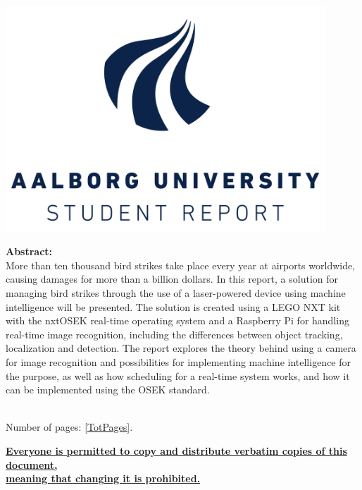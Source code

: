 \begin{minipage}[T]{0.45\textwidth}
 \begin{flushright}
  \includegraphics[width=0.9\textwidth]{images/aau_logo.pdf}\\[1.0 cm]
 \end{flushright}
 \begin{flushleft}
  \textbf{Abstract:}\\
    More than ten thousand bird strikes take place every year at airports worldwide, causing damages for more than a billion dollars. 
    In this report, a solution for managing bird strikes through the use of a laser-powered device using machine intelligence will be presented.
    The solution is created using a LEGO NXT kit with the nxtOSEK real-time operating system and a Raspberry Pi for handling real-time image recognition, including the differences between object tracking, localization and detection.
    The report explores the theory behind using a camera for image recognition and possibilities for implementing machine intelligence for the purpose, as well as how scheduling for a real-time system works, and how it can be implemented using the OSEK standard.


 \end{flushleft}
\end{minipage}\\
Number of pages: \ref{TotPages}.\\
\begin{center}
 \begin{scriptsize}
  \textbf{\underline{Everyone is permitted to copy and distribute verbatim copies of this document,}}\\ \textbf{\underline{ meaning that changing it is prohibited.}}
 \end{scriptsize}
\end{center}
